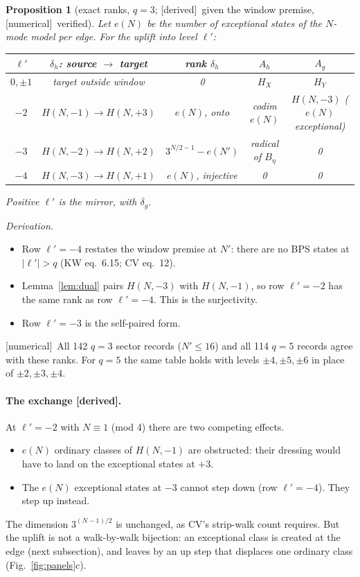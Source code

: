 \documentclass[11pt]{article}
\newcommand{\Np}{N'}
\newcommand{\lp}{\ell'}
\newcommand{\tagbox}[2]{\textsf{\small\color{#1}[#2]}}
\newcommand{\DER}{\tagbox{cder}{derived}}
\newcommand{\NUM}{\tagbox{cnum}{numerical}}
\theoremstyle{plain}
\newtheorem{proposition}{Proposition}
\theoremstyle{remark}
\numberwithin{equation}{section}
\begin{document}
\begin{proposition}[exact ranks, $q=3$; \DER\ given the window premise, \NUM\ verified]\label{prop:ranks}
Let $e(N)$ be the number of exceptional states of the $N$-mode model per edge. For the uplift into level $\lp$:

\begin{center}\small
\begin{tabular}{ccccc}
\toprule
$\lp$ & $\delta_h$: source $\to$ target & rank $\delta_h$ & $A_h$ & $A_g$\\
\midrule
$0,\pm1$ & target outside window & 0 & $H_X$ & $H_Y$\\
$-2$ & $H(N,-1)\to H(N,+3)$ & $e(N)$, onto & codim $e(N)$ & $H(N,-3)$ ($e(N)$ exceptional)\\
$-3$ & $H(N,-2)\to H(N,+2)$ & $3^{N/2-1}-e(\Np)$ & radical of $B_\eta$ & 0\\
$-4$ & $H(N,-3)\to H(N,+1)$ & $e(N)$, injective & 0 & 0\\
\bottomrule
\end{tabular}
\end{center}
\noindent Positive $\lp$ is the mirror, with $\delta_g$.
\end{proposition}
\noindent\emph{Derivation.}
\begin{itemize}\itemsep1pt
\item Row $\lp=-4$ restates the window premise at $\Np$: there are no BPS states at $|\lp|>q$ (KW eq.~6.15; CV eq.~12).
\item Lemma~\ref{lem:dual} pairs $H(N,-3)$ with $H(N,-1)$, so row $\lp=-2$ has the same rank as row $\lp=-4$. This is
the surjectivity.
\item Row $\lp=-3$ is the self-paired form.
\end{itemize}
\NUM\ All 142 $q=3$ sector records ($\Np\le16$) and all 114 $q=5$ records agree with these ranks. For $q=5$ the same
table holds with levels $\pm4,\pm5,\pm6$ in place of $\pm2,\pm3,\pm4$.

\paragraph{The exchange \DER.} At $\lp=-2$ with $N\equiv1$ (mod 4) there are two competing effects.
\begin{itemize}\itemsep1pt
\item $e(N)$ ordinary classes of $H(N,-1)$ are obstructed: their dressing would have to land on the exceptional states
at $+3$.
\item The $e(N)$ exceptional states at $-3$ cannot step down (row $\lp=-4$). They step up instead.
\end{itemize}
The dimension $3^{(N-1)/2}$ is unchanged, as CV's strip-walk count requires. But the uplift is not a walk-by-walk
bijection: an exceptional class is created at the edge (next subsection), and leaves by an up step that displaces one
ordinary class (Fig.~\ref{fig:panels}c).
\end{document}
